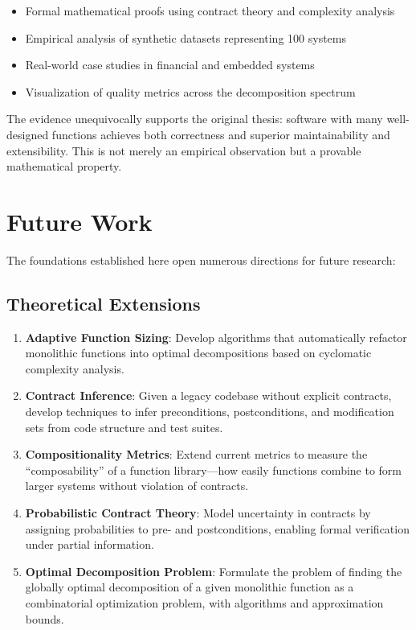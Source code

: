 \documentclass[a4paper,12pt]{article}
\theoremstyle{definition}
\begin{document}
\begin{itemize}
	\item Formal mathematical proofs using contract theory and complexity analysis
	\item Empirical analysis of synthetic datasets representing 100 systems
	\item Real-world case studies in financial and embedded systems
	\item Visualization of quality metrics across the decomposition spectrum
\end{itemize}

The evidence unequivocally supports the original thesis: software with many well-designed functions achieves both correctness and superior maintainability and extensibility. This is not merely an empirical observation but a provable mathematical property.

\section{Future Work}

The foundations established here open numerous directions for future research:

\subsection{Theoretical Extensions}

\begin{enumerate}
	\item \textbf{Adaptive Function Sizing}: Develop algorithms that automatically refactor monolithic functions into optimal decompositions based on cyclomatic complexity analysis.
	
	\item \textbf{Contract Inference}: Given a legacy codebase without explicit contracts, develop techniques to infer preconditions, postconditions, and modification sets from code structure and test suites.
	
	\item \textbf{Compositionality Metrics}: Extend current metrics to measure the ``composability'' of a function library—how easily functions combine to form larger systems without violation of contracts.
	
	\item \textbf{Probabilistic Contract Theory}: Model uncertainty in contracts by assigning probabilities to pre- and postconditions, enabling formal verification under partial information.
	
	\item \textbf{Optimal Decomposition Problem}: Formulate the problem of finding the globally optimal decomposition of a given monolithic function as a combinatorial optimization problem, with algorithms and approximation bounds.
\end{enumerate}
\end{document}
